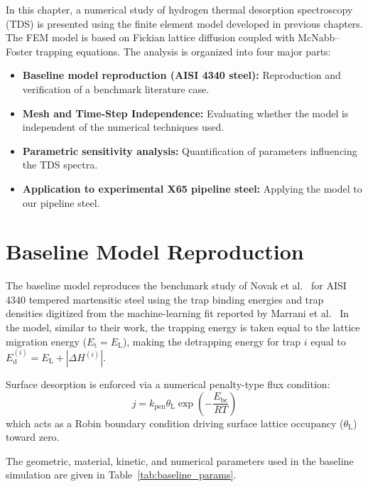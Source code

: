 \documentclass[a4paper,12pt,oneside]{report}
\begin{document}
In this chapter, a numerical study of hydrogen thermal desorption spectroscopy (TDS) is presented using the finite element model developed in previous chapters. The FEM model is based on Fickian lattice diffusion coupled with McNabb--Foster trapping equations. The analysis is organized into four major parts:

\begin{itemize}
    \item \textbf{Baseline model reproduction (AISI 4340 steel):} Reproduction and verification of a benchmark literature case.
    \item \textbf{Mesh and Time-Step Independence:} Evaluating whether the model is independent of the numerical techniques used.
    \item \textbf{Parametric sensitivity analysis:} Quantification of parameters influencing the TDS spectra.
    \item \textbf{Application to experimental X65 pipeline steel:} Applying the model to our pipeline steel.
\end{itemize}

\section{Baseline Model Reproduction}

The baseline model reproduces the benchmark study of Novak et al.~\cite{Novak2010} for AISI 4340 tempered martensitic steel using the trap binding energies and trap densities digitized from the machine-learning fit reported by Marrani et al.~\cite{Marrani2025} In the model, similar to their work, the trapping energy is taken equal to the lattice migration energy ($E_{\mathrm{t}} = E_{\mathrm{L}}$), making the detrapping energy for trap $i$ equal to $E_{\mathrm{d}}^{(i)} = E_{\mathrm{L}} + |\Delta H^{(i)}|$.

Surface desorption is enforced via a numerical penalty-type flux condition:
\begin{equation}
j = k_{\mathrm{pen}} \theta_{\mathrm{L}} \exp\left(-\frac{E_{\mathrm{bc}}}{RT}\right)
\end{equation}
which acts as a Robin boundary condition driving surface lattice occupancy ($\theta_{\mathrm{L}}$) toward zero.

The geometric, material, kinetic, and numerical parameters used in the baseline simulation are given in Table~\ref{tab:baseline_params}.
\end{document}
